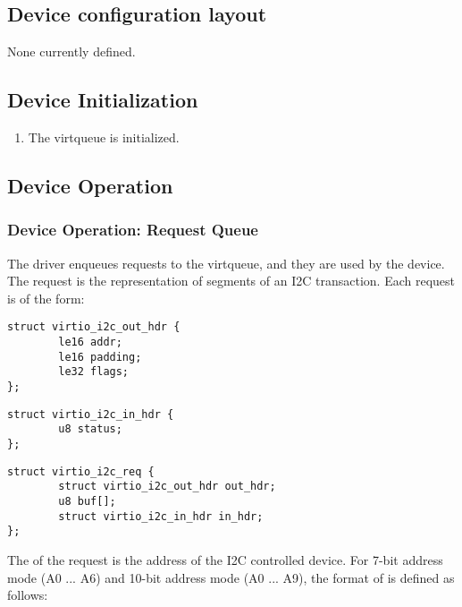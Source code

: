 \subsection{Device configuration layout}\label{sec:Device Types / I2C Adapter Device / Device configuration layout}

None currently defined.

\subsection{Device Initialization}\label{sec:Device Types / I2C Adapter Device / Device Initialization}

\begin{enumerate}
\item The virtqueue is initialized.
\end{enumerate}

\subsection{Device Operation}\label{sec:Device Types / I2C Adapter Device / Device Operation}

\subsubsection{Device Operation: Request Queue}\label{sec:Device Types / I2C Adapter Device / Device Operation: Request Queue}

The driver enqueues requests to the virtqueue, and they are used by the
device. The request is the representation of segments of an I2C
transaction. Each request is of the form:

\begin{lstlisting}
struct virtio_i2c_out_hdr {
        le16 addr;
        le16 padding;
        le32 flags;
};
\end{lstlisting}

\begin{lstlisting}
struct virtio_i2c_in_hdr {
        u8 status;
};
\end{lstlisting}

\begin{lstlisting}
struct virtio_i2c_req {
        struct virtio_i2c_out_hdr out_hdr;
        u8 buf[];
        struct virtio_i2c_in_hdr in_hdr;
};
\end{lstlisting}

The  of the request is the address of the I2C controlled device.
For 7-bit address mode (A0 ... A6) and 10-bit address mode (A0 ... A9),
the format of  is defined as follows:

